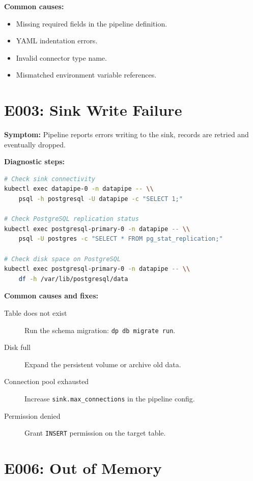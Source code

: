 \documentclass[
    language=english,
    doctype=manual,
    institution=none,
    titlestyle=book,
    oneside,
]{../../omnilatex}
\begin{document}
\textbf{Common causes:}

\begin{itemize}
    \item Missing required fields in the pipeline definition.
    \item YAML indentation errors.
    \item Invalid connector type name.
    \item Mismatched environment variable references.
\end{itemize}

\section{E003: Sink Write Failure}
\label{sec:e003}

\textbf{Symptom:} Pipeline reports errors writing to the sink, records
are retried and eventually dropped.

\textbf{Diagnostic steps:}

\begin{lstlisting}[language=bash]
# Check sink connectivity
kubectl exec datapipe-0 -n datapipe -- \\
    psql -h postgresql -U datapipe -c "SELECT 1;"

# Check PostgreSQL replication status
kubectl exec postgresql-primary-0 -n datapipe -- \\
    psql -U postgres -c "SELECT * FROM pg_stat_replication;"

# Check disk space on PostgreSQL
kubectl exec postgresql-primary-0 -n datapipe -- \\
    df -h /var/lib/postgresql/data
\end{lstlisting}

\textbf{Common causes and fixes:}

\begin{description}
    \item[Table does not exist] Run the schema migration:
        \texttt{dp db migrate run}.
    \item[Disk full] Expand the persistent volume or archive old data.
    \item[Connection pool exhausted] Increase
        \texttt{sink.max\_connections} in the pipeline config.
    \item[Permission denied] Grant \texttt{INSERT} permission on the
        target table.
\end{description}

\section{E006: Out of Memory}
\label{sec:e006}
\end{document}
